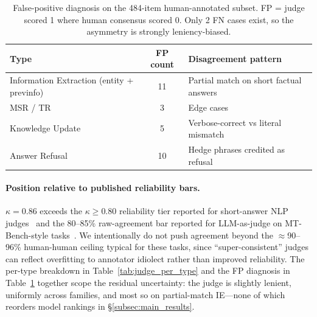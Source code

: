 \documentclass{article}
\begin{document}
\begin{table}[h]
\centering
\small
\caption{False-positive diagnosis on the 484-item human-annotated subset. FP = judge scored 1 where human consensus scored 0. Only 2 FN cases exist, so the asymmetry is strongly leniency-biased.}
\label{tab:judge_fp}
\begin{tabular}{@{}lcl@{}}
\toprule
\textbf{Type} & \textbf{FP count} & \textbf{Disagreement pattern} \\
\midrule
Information Extraction (entity + previnfo) & 11 & Partial match on short factual answers \\
MSR / TR & 3 & Edge cases \\
Knowledge Update & 5 & Verbose-correct vs literal mismatch \\
Answer Refusal & 10 & Hedge phrases credited as refusal \\
\bottomrule
\end{tabular}
\end{table}

\paragraph{Position relative to published reliability bars.}
$\kappa = 0.86$ exceeds the $\kappa \geq 0.80$ reliability tier reported for short-answer NLP judges~\cite{cohen1960coefficient} and the 80--85\% raw-agreement bar reported for LLM-as-judge on MT-Bench-style tasks~\cite{zheng2023judging}.
We intentionally do not push agreement beyond the ${\approx}$90--96\% human-human ceiling typical for these tasks, since ``super-consistent'' judges can reflect overfitting to annotator idiolect rather than improved reliability.
The per-type breakdown in Table~\ref{tab:judge_per_type} and the FP diagnosis in Table~\ref{tab:judge_fp} together scope the residual uncertainty: the judge is slightly lenient, uniformly across families, and most so on partial-match IE---none of which reorders model rankings in \S\ref{subsec:main_results}.
\end{document}
